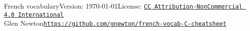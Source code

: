 \documentclass[10pt,landscape,letter]{article}
\begin{document}
{
\Large French vocabulary\hfill \small Version: \today\hfill License: \href{https://creativecommons.org/licenses/by-nc/4.0/}{\tt CC Attribution-NonCommercial 4.0 International}}\\
 {Glen Newton}\hfill {\tt \url{https://github.com/gnewton/french-vocab-C-cheatsheet}}
    
\footnotesize
\begin{multicols*}{4}
  
  
  
  
  
  
\end{multicols*}
\end{document}
